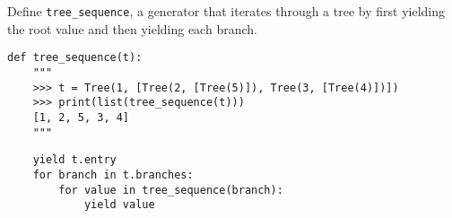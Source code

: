 \begin{blocksection}
\question Define \lstinline$tree_sequence$, a generator that iterates through a tree by first yielding the root value and then yielding each branch.

\begin{lstlisting}
def tree_sequence(t):
    """
    >>> t = Tree(1, [Tree(2, [Tree(5)]), Tree(3, [Tree(4)])])
    >>> print(list(tree_sequence(t)))
    [1, 2, 5, 3, 4]
    """
\end{lstlisting}

\begin{solution}[0.5in]
\begin{lstlisting}
	yield t.entry
	for branch in t.branches:
		for value in tree_sequence(branch):
			yield value
\end{lstlisting}
\end{solution}
\end{blocksection}
